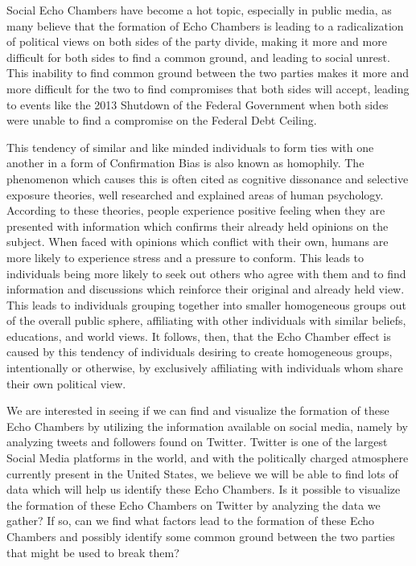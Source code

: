 \documentclass[journal]{IEEEtran}
\begin{document}
	Social Echo Chambers have become a hot topic, especially in public media, as many believe that the formation of Echo Chambers is leading to a radicalization of political views on both sides of the party divide, making it more and more difficult for both sides to find a common ground, and leading to social unrest. This inability to find common ground between the two parties makes it more and more difficult for the two to find compromises that both sides will accept, leading to events like the 2013 Shutdown of the Federal Government when both sides were unable to find a compromise on the Federal Debt Ceiling. 
	
	This tendency of similar and like minded individuals to form ties with one another in a form of Confirmation Bias is also known as homophily. The phenomenon which causes this is often cited as cognitive dissonance and selective exposure theories, well researched and explained areas of human psychology. According to these theories, people experience positive feeling when they are presented with information which confirms their already held opinions on the subject. When faced with opinions which conflict with their own, humans are more likely to experience stress and a pressure to conform. This leads to individuals being more likely to seek out others who agree with them and to find information and discussions which reinforce their original and already held view. This leads to individuals grouping together into smaller homogeneous groups out of the overall public sphere, affiliating with other individuals with similar beliefs, educations, and world views. It follows, then, that the Echo Chamber effect is caused by this tendency of individuals desiring to create homogeneous groups, intentionally or otherwise, by exclusively affiliating with individuals whom share their own political view. 
	
	We are interested in seeing if we can find and visualize the formation of these Echo Chambers by utilizing the information available on social media, namely by analyzing tweets and followers found on Twitter. Twitter is one of the largest Social Media platforms in the world, and with the politically charged atmosphere currently present in the United States, we believe we will be able to find lots of data which will help us identify these Echo Chambers. Is it possible to visualize the formation of these Echo Chambers on Twitter by analyzing the data we gather? If so, can we find what factors lead to the formation of these Echo Chambers and possibly identify some common ground between the two parties that might be used to break them? 
	
\end{document}

